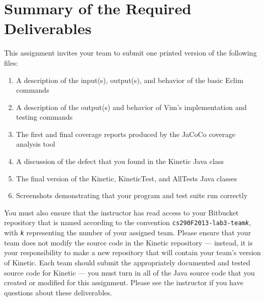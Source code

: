 \section*{Summary of the Required Deliverables}

This assignment invites your team to submit one printed version of the following files:

\begin{enumerate}
	
	\item A description of the input(s), output(s), and behavior of the basic Eclim commands 
	\item A description of the output(s) and behavior of Vim's implementation and testing commands
	\item The first and final coverage reports produced by the JaCoCo coverage analysis tool
	\item A discussion of the defect that you found in the Kinetic Java class
	\item The final version of the Kinetic, KineticTest, and AllTests Java classes
	\item Screenshots demonstrating that your program and test suite run correctly
\end{enumerate}

You must also ensure that the instructor has read access to your Bitbucket repository that is named according to the
convention {\tt cs290F2013-lab3-team{\em k}}, with {\tt {\em k}} representing the number of your assigned team.  Please
ensure that your team does not modify the source code in the Kinetic repository --- instead, it is your responsibility
to make a new repository that will contain your team's version of Kinetic.  Each team should submit the appropriately
documented and tested source code for Kinetic --- you must turn in all of the Java source code that you created
or modified for this assignment. Please see the instructor if you have questions about these deliverables.


